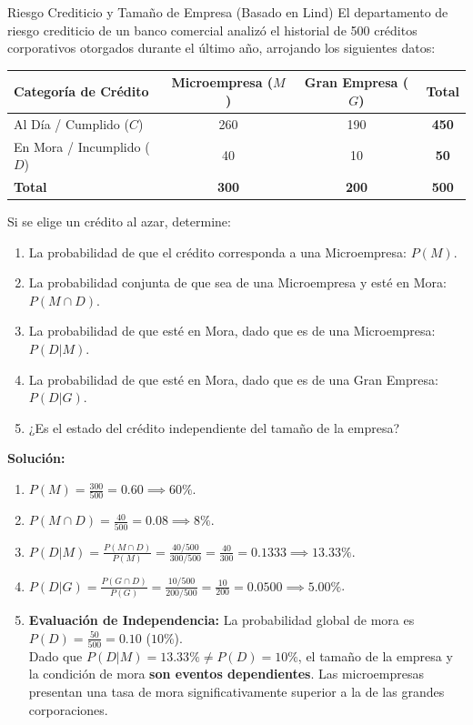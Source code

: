 \begin{ejemplo}{Riesgo Crediticio y Tamaño de Empresa (Basado en Lind)}
El departamento de riesgo crediticio de un banco comercial analizó el historial de 500 créditos corporativos otorgados durante el último año, arrojando los siguientes datos:

\begin{center}
\begin{tabular}{lccc}
\toprule
\textbf{Categoría de Crédito} & \textbf{Microempresa ($M$)} & \textbf{Gran Empresa ($G$)} & \textbf{Total} \\
\midrule
Al Día / Cumplido ($C$) & 260 & 190 & \textbf{450} \\
En Mora / Incumplido ($D$) & 40 & 10 & \textbf{50} \\
\midrule
\textbf{Total} & \textbf{300} & \textbf{200} & \textbf{500} \\
\bottomrule
\end{tabular}
\end{center}

Si se elige un crédito al azar, determine:
\begin{enumerate}[label=\alph*)]
    \item La probabilidad de que el crédito corresponda a una Microempresa: $P(M)$.
    \item La probabilidad conjunta de que sea de una Microempresa y esté en Mora: $P(M \cap D)$.
    \item La probabilidad de que esté en Mora, dado que es de una Microempresa: $P(D|M)$.
    \item La probabilidad de que esté en Mora, dado que es de una Gran Empresa: $P(D|G)$.
    \item ¿Es el estado del crédito independiente del tamaño de la empresa?
\end{enumerate}

\tcbline
\textbf{Solución:}
\begin{enumerate}[label=\alph*)]
    \item $P(M) = \frac{300}{500} = 0.60 \implies 60\%$.
    \item $P(M \cap D) = \frac{40}{500} = 0.08 \implies 8\%$.
    \item $P(D|M) = \frac{P(M \cap D)}{P(M)} = \frac{40/500}{300/500} = \frac{40}{300} = 0.1333 \implies 13.33\%$.
    \item $P(D|G) = \frac{P(G \cap D)}{P(G)} = \frac{10/500}{200/500} = \frac{10}{200} = 0.0500 \implies 5.00\%$.
    \item \textbf{Evaluación de Independencia:}
    La probabilidad global de mora es $P(D) = \frac{50}{500} = 0.10$ ($10\%$).\\
    Dado que $P(D|M) = 13.33\% \neq P(D) = 10\%$, el tamaño de la empresa y la condición de mora \textbf{son eventos dependientes}. Las microempresas presentan una tasa de mora significativamente superior a la de las grandes corporaciones.
\end{enumerate}
\end{ejemplo}

